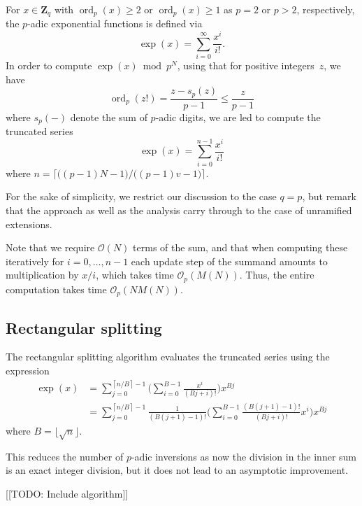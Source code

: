 \documentclass[a4paper,11pt]{article}
\theoremstyle{definition}
\DeclareMathOperator{\ord}{ord}
\providecommand{\ceil}[1]{\left\lceil#1\right\rceil}%
\providecommand{\ceilbig}[1]{\bigl\lceil#1\bigr\rceil}%
\providecommand{\floorts}[1]{\lfloor#1\rfloor}%
\begin{document}
For $x \in \mathbf{Z}_q$ with $\ord_p(x) \geq 2$ or $\ord_p(x) \geq 1$ 
as $p=2$ or $p > 2$, respectively, the $p$-adic exponential functions is 
defined via 
\begin{equation}
\exp(x) = \sum_{i = 0}^{\infty} \frac{x^i}{i!}.
\end{equation}
In order to compute $\exp(x) \bmod{p^N}$, using that for positive 
integers~$z$, we have
\begin{equation}
\ord_p(z!) = \frac{z - s_p(z)}{p - 1} \leq \frac{z}{p - 1}
\end{equation}
where $s_p(-)$ denote the sum of $p$-adic digits, we are led to compute 
the truncated series 
\begin{equation}
\exp(x) = \sum_{i = 0}^{n-1} \frac{x^i}{i!}
\end{equation}
where $n = \ceilbig{\bigl( (p-1)N - 1 \bigr) / \bigl( (p-1)v - 1 \bigr)}$.

For the sake of simplicity, we restrict our discussion to the case 
$q = p$, but remark that the approach as well as the analysis carry 
through to the case of unramified extensions.

Note that we require $\mathcal{O}(N)$ terms of the sum, 
and that when computing these iteratively for $i = 0, \dotsc, n-1$ 
each update step of the summand amounts to multiplication by $x / i$, 
which takes time $\mathcal{O}_p(M(N))$.  Thus, the entire computation 
takes time $\mathcal{O}_p(N M(N))$.

\subsection{Rectangular splitting}

The rectangular splitting algorithm evaluates the truncated series 
using the expression 
\begin{align}
\exp(x) & = \sum_{j=0}^{\ceil{n/B} - 1} 
            \biggl( \sum_{i=0}^{B-1} \frac{x^i}{(Bj + i)!} \biggr) x^{Bj} \\
        & = \sum_{j=0}^{\ceil{n/B} - 1} 
            \frac{1}{(B (j+1) - 1)!} \biggl( \sum_{i=0}^{B-1} \frac{(B (j+1) - 1)!}{(Bj + i)!} x^i \biggr) x^{Bj}
\end{align}
where $B = \floorts{\sqrt{n}}$.

This reduces the number of $p$-adic inversions as now the division in the 
inner sum is an exact integer division, but it does not lead to an asymptotic 
improvement.

[[TODO:  Include algorithm]]
\end{document}
